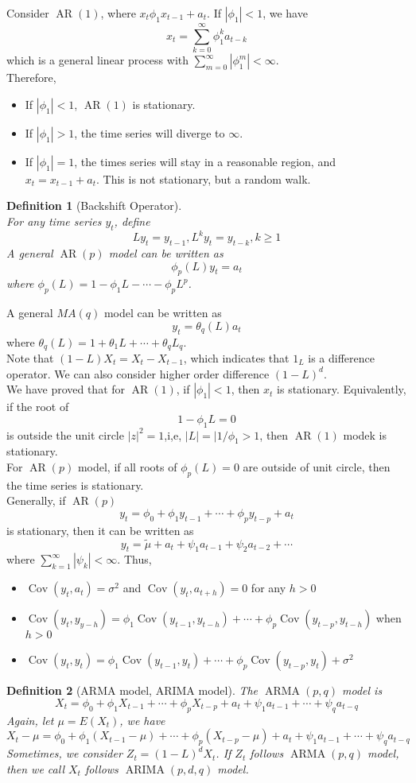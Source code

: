\documentclass[12pt]{article}
\newtheorem{definition}{Definition}[section]
\theoremstyle{definition}
\DeclareMathOperator{\cov}{Cov}
\DeclareMathOperator{\ARMA}{ARMA}
\DeclareMathOperator{\AR}{AR}
\DeclareMathOperator{\ARIMA}{ARIMA}
\begin{document}
Consider $\AR(1)$, where $x_t\phi_1x_{t-1} + a_t$. If $|\phi_1| < 1$, we have
\[
x_t = \sum_{k=0}^\infty \phi_1^ka_{t-k}
\]
which is a general linear process with $\sum_{m=0}^\infty |\phi_1^m|<\infty$.\\
Therefore,
\begin{itemize}
  \item If $|\phi_1|<1$, $\AR(1)$ is stationary.
  \item If $|\phi_1|>1$, the time series will diverge to $\infty$.
  \item If $|\phi_1| = 1$, the times series will stay in a reasonable region, and $x_t = x_{t-1} + a_t$. This is not stationary, but a random walk.
\end{itemize}
\begin{definition}[Backshift Operator]
\hfill\\\normalfont For any time series $y_t$, define
\[
Ly_t = y_{t-1}, L^ky_t = y_{t-k}, k\geq 1
\]
A general $\AR(p)$ model can be written as
\[
\phi_p(L)y_t = a_t
\]
where $\phi_p(L)=1-\phi_1L - \cdots - \phi_pL^p$.
\end{definition}
A general $MA(q)$ model can be written as
\[
y_t = \theta_q(L)a_t
\]
where $\theta_q(L) = 1+ \theta_1L + \cdots + \theta_qL_q$.\\
Note that $(1-L)X_t = X_t - X_{t-1}$, which indicates that $1_L$ is a difference operator. We can also consider higher order difference $(1-L)^d$.\\
We have proved that for $\AR(1)$, if $|\phi_1| < 1$, then $x_t$ is stationary. Equivalently, if the root of 
\[
1-\phi_1L=0
\]
is outside the unit circle $|z|^2 = 1$,i,e, $|L|=|1/\phi_1>1$, then $\AR(1)$ modek is stationary.\\
For $\AR(p)$ model, if all roots of $\phi_p(L)=0$ are outside of unit circle, then the time series is stationary.\\
Generally, if $\AR(p)$ 
\[
y_t = \phi_0 + \phi_1y_{t-1} + \cdots +\phi_py_{t-p} + a_t
\]
is stationary, then it can be written as
\[
y_t = \tilde{\mu} + a_t + \psi_1a_{t-1} + \psi_2a_{t-2} + \cdots
\]
where $\sum_{k=1}^\infty |\psi_k| < \infty$. Thus,
\begin{itemize}
  \item $\cov(y_t, a_t) = \sigma^2$ and $\cov(y_t, a_{t+h}) = 0$ for any $h>0$
  \item $\cov(y_t, y_{y-h})=\phi_1\cov(y_{t-1}, y_{t-h}) + \cdots + \phi_p \cov(y_{t-p}, y_{t-h})$ when $h>0$
  \item $\cov(y_t, y_t) = \phi_1\cov(y_{t-1}, y_t) + \cdots + \phi_p\cov(y_{t-p}, y_t) + \sigma^2$
\end{itemize}
\begin{definition}[ARMA model, ARIMA model]
The $\ARMA(p,q)$ model is
\[
X_t = \phi_0 + \phi_1X_{t-1} + \cdots + \phi_pX_{t-p} + a_t + \psi_1 a_{t-1} + \cdots + \psi_q a_{t-q}
\]
Again, let $\mu = E(X_t)$, we have
\[
X_t-\mu = \phi_0 + \phi_1(X_{t-1}-\mu) + \cdots + \phi_p (X_{t-p}-\mu) + a_t + \psi_1a_{t-1} + \cdots + \psi_q a_{t-q}
\]
Sometimes, we consider $Z_t = (1-L)^d X_t$. If $Z_t$ follows $\ARMA(p,q)$ model, then we call $X_t$ follows $\ARIMA(p, d, q)$ model.
\end{definition}
\end{document}
